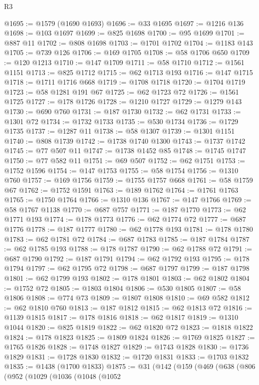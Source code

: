 \begin{lexlean}{R3}
\begin{coremodule}
@1695 := @1579 (@1690 @1693)
@1696 := @33 @1695
@1697 := @1216 @136
@1698 := @103 @1697
@1699 := @825 @1698
@1700 := @95 @1699
@1701 := @887 @11
@1702 := @808 @1698
@1703 := @1701 @1702
@1704 := @1183 @143
@1705 := @739 @126
@1706 := @169 @1705
@1708 := @58 @1706 @650
@1709 := @120 @1213
@1710 := @147 @1709
@1711 := @58 @1710
@1712 := @1561 @1151
@1713 := @825 @1712
@1715 := @62 @1713 @193
@1716 := @147 @1715
@1718 := @1711 @1716 @668
@1719 := @1708 @1718
@1720 := @1704 @1719
@1723 := @58 @1281 @191 @67
@1725 := @62 @1723 @72
@1726 := @1561 @1725
@1727 := @178 @1726
@1728 := @1210 @1727
@1729 := @1279 @143
@1730 := @690 @760
@1731 := @187 @1730
@1732 := @62 @1731
@1733 := @1301 @72
@1734 := @1732 @1733
@1735 := @530 @1734
@1736 := @1729 @1735
@1737 := @1287 @11
@1738 := @58 @1307
@1739 := @1301 @1151
@1740 := @808 @1739
@1742 := @1738 @1740 @1300
@1743 := @1737 @1742
@1745 := @77 @507 @11
@1747 := @1738 @1452 @85
@1748 := @1745 @1747
@1750 := @77 @582 @11
@1751 := @69 @507
@1752 := @62 @1751
@1753 := @1752 @1596
@1754 := @147 @1753
@1755 := @58 @1754
@1756 := @1310 @760
@1757 := @169 @1756
@1759 := @1755 @1757 @668
@1761 := @58 @1759 @67
@1762 := @1752 @1591
@1763 := @189 @1762
@1764 := @1761 @1763
@1765 := @1750 @1764
@1766 := @1310 @136
@1767 := @147 @1766
@1769 := @58 @1767 @1138
@1770 := @687 @757
@1771 := @187 @1770
@1773 := @62 @1771 @193
@1774 := @178 @1773
@1776 := @62 @1774 @72
@1777 := @687 @1776
@1778 := @187 @1777
@1780 := @62 @1778 @193
@1781 := @178 @1780
@1783 := @62 @1781 @72
@1784 := @687 @1783
@1785 := @187 @1784
@1787 := @62 @1785 @193
@1788 := @178 @1787
@1790 := @62 @1788 @72
@1791 := @687 @1790
@1792 := @187 @1791
@1794 := @62 @1792 @193
@1795 := @178 @1794
@1797 := @62 @1795 @72
@1798 := @687 @1797
@1799 := @187 @1798
@1801 := @62 @1799 @193
@1802 := @178 @1801
@1803 := @62 @1802
@1804 := @1752 @72
@1805 := @1803 @1804
@1806 := @530 @1805
@1807 := @58 @1806
@1808 := @774 @73
@1809 := @1807 @1808
@1810 := @69 @582
@1812 := @62 @1810 @760
@1813 := @187 @1812
@1815 := @62 @1813 @72
@1816 := @1139 @1815
@1817 := @178 @1816
@1818 := @62 @1817
@1819 := @1310 @1044
@1820 := @825 @1819
@1822 := @62 @1820 @72
@1823 := @1818 @1822
@1824 := @178 @1823
@1825 := @1809 @1824
@1826 := @1769 @1825
@1827 := @1765 @1826
@1828 := @1748 @1827
@1829 := @1743 @1828
@1830 := @1736 @1829
@1831 := @1728 @1830
@1832 := @1720 @1831
@1833 := @1703 @1832
@1835 := @1438 (@1700 @1833)
@1875 := @31
    (@142
      (@159
        (@469
          (@638
            (@806
              (@952
                (@1029
                  (@1036
                    (@1048
                      (@1052

\end{coremodule}
\end{lexlean}
